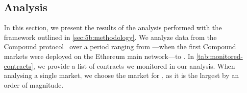 


\subsection{Analysis}
\label{sec:5b:analysis}
In this section, we present the results of the analysis performed with the framework outlined in \autoref{sec:5b:methodology}.
We analyze data from the Compound protocol~\cite{leshner2018} over a period ranging from \StartDate---when the first Compound markets were deployed on the Ethereum main network---to \EndDate.
In \autoref{tab:monitored-contracts}, we provide a list of contracts we monitored in our analysis.
When analysing a single market, we choose the market for , as it is the largest by an order of magnitude.

